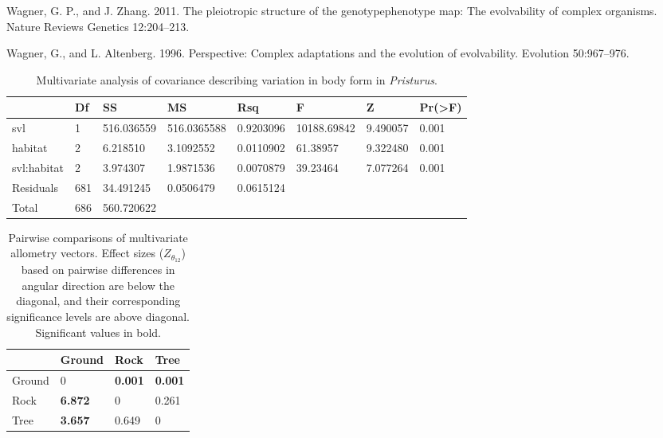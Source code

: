 \documentclass[
  11pt,
]{article}
\newlength{\cslhangindent}
\newlength{\cslentryspacingunit} %
\newenvironment{CSLReferences}[2] %
 {%
  \setlength{\parindent}{0pt}
  \ifodd #1
  \let\oldpar\par
  \def\par{\hangindent=\cslhangindent\oldpar}
  \fi
  \setlength{\parskip}{#2\cslentryspacingunit}
 }%
 {}
\begin{document}
\begin{CSLReferences}{1}{0}
\leavevmode{}%
Wagner, G. P., and J. Zhang. 2011. The pleiotropic structure of the
genotype{\textendash}phenotype map: The evolvability of complex
organisms. Nature Reviews Genetics 12:204--213.

\leavevmode{}%
Wagner, G., and L. Altenberg. 1996. Perspective: Complex adaptations and
the evolution of evolvability. Evolution 50:967--976.

\end{CSLReferences}

\newpage

\begin{table}[H]

\caption{\label{tab:unnamed-chunk-1}Multivariate analysis of covariance describing variation in body form in \textit{Pristurus}.}
\centering
\begin{tabular}[t]{llllllll}
\toprule
  & Df & SS & MS & Rsq & F & Z & Pr(>F)\\
\midrule
svl & 1 & 516.036559 & 516.0365588 & 0.9203096 & 10188.69842 & 9.490057 & 0.001\\
habitat & 2 & 6.218510 & 3.1092552 & 0.0110902 & 61.38957 & 9.322480 & 0.001\\
svl:habitat & 2 & 3.974307 & 1.9871536 & 0.0070879 & 39.23464 & 7.077264 & 0.001\\
Residuals & 681 & 34.491245 & 0.0506479 & 0.0615124 &  &  & \\
Total & 686 & 560.720622 &  &  &  &  & \\
\bottomrule
\end{tabular}
\end{table}

\newpage

\begin{table}[H]

\caption{\label{tab:unnamed-chunk-2}Pairwise comparisons of multivariate allometry vectors. Effect sizes ($Z_{\theta_{12}}$) based on pairwise differences in angular direction are below the diagonal, and their corresponding significance levels are above diagonal. Significant values in bold.}
\centering
\begin{tabular}[t]{llll}
\toprule
  & Ground & Rock & Tree\\
\midrule
Ground & 0 & \textbf{0.001} & \textbf{0.001}\\
Rock & \textbf{6.872} & 0 & 0.261\\
Tree & \textbf{3.657} & 0.649 & 0\\
\bottomrule
\end{tabular}
\end{table}
\end{document}
